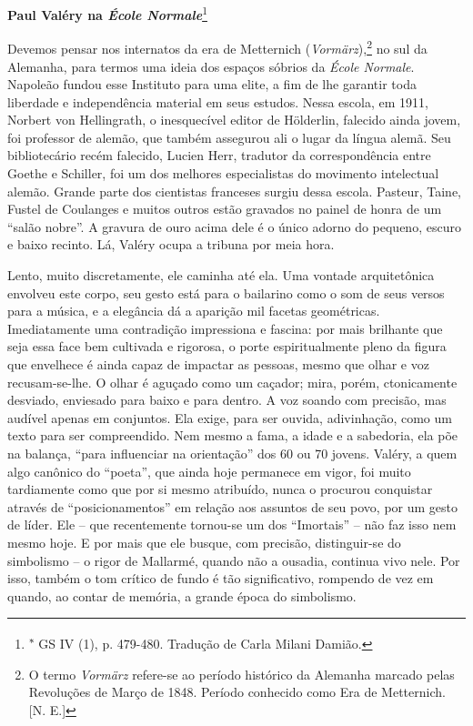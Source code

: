 \textbf{Paul Valéry na \emph{École Normale}}\footnote{\textsuperscript{∗}
  GS IV (1), p. 479-480. Tradução de Carla Milani Damião.}

Devemos pensar nos internatos da era de Metternich
(\emph{Vormärz}),\footnote{O termo \emph{Vormärz} refere-se ao período
  histórico da Alemanha marcado pelas Revoluções de Março de 1848.
  Período conhecido como Era de Metternich. {[}N. E.{]}} no sul da
Alemanha, para termos uma ideia dos espaços sóbrios da \emph{École
Normale}. Napoleão fundou esse Instituto para uma elite, a fim de lhe
garantir toda liberdade e independência material em seus estudos. Nessa
escola, em 1911, Norbert von Hellingrath, o inesquecível editor de
Hölderlin, falecido ainda jovem, foi professor de alemão, que também
assegurou ali o lugar da língua alemã. Seu bibliotecário recém falecido,
Lucien Herr, tradutor da correspondência entre Goethe e Schiller, foi um
dos melhores especialistas do movimento intelectual alemão. Grande parte
dos cientistas franceses surgiu dessa escola. Pasteur, Taine, Fustel de
Coulanges e muitos outros estão gravados no painel de honra de um
``salão nobre''. A gravura de ouro acima dele é o único adorno do
pequeno, escuro e baixo recinto. Lá, Valéry ocupa a tribuna por meia
hora.

Lento, muito discretamente, ele caminha até ela. Uma vontade
arquitetônica envolveu este corpo, seu gesto está para o bailarino como
o som de seus versos para a música, e a elegância dá a aparição mil
facetas geométricas. Imediatamente uma contradição impressiona e
fascina: por mais brilhante que seja essa face bem cultivada e rigorosa,
o porte espiritualmente pleno da figura que envelhece é ainda capaz de
impactar as pessoas, mesmo que olhar e voz recusam-se-lhe. O olhar é
aguçado como um caçador; mira, porém, ctonicamente desviado, enviesado
para baixo e para dentro. A voz soando com precisão, mas audível apenas
em conjuntos. Ela exige, para ser ouvida, adivinhação, como um texto
para ser compreendido. Nem mesmo a fama, a idade e a sabedoria, ela põe
na balança, ``para influenciar na orientação'' dos 60 ou 70 jovens.
Valéry, a quem algo canônico do ``poeta'', que ainda hoje permanece em
vigor, foi muito tardiamente como que por si mesmo atribuído, nunca o
procurou conquistar através de ``posicionamentos'' em relação aos
assuntos de seu povo, por um gesto de líder. Ele -- que recentemente
tornou-se um dos ``Imortais'' -- não faz isso nem mesmo hoje. E por mais
que ele busque, com precisão, distinguir-se do simbolismo -- o rigor de
Mallarmé, quando não a ousadia, continua vivo nele. Por isso, também o
tom crítico de fundo é tão significativo, rompendo de vez em quando, ao
contar de memória, a grande época do simbolismo.

